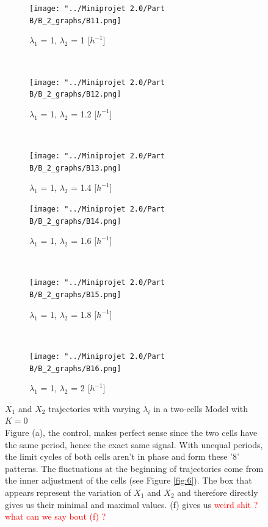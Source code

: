 \documentclass[10pt,a4paper,oneside,twocolumn]{article}
\newcommand{\red}[1]{\textcolor{red}{#1}}
\numberwithin{equation}{section} %
\begin{document}
    \begin{figure}
    \centering
	\begin{subfigure}[b]{0.32\textwidth}
	    \texttt{[image: "../Miniprojet 2.0/Part B/B\_2\_graphs/B11.png]}
	    \caption{$\lambda_1$ = 1, $\lambda_2$ = 1 [$h^{-1}$]}
	\end{subfigure}
	~ 
	\begin{subfigure}[b]{0.32\textwidth}
	    \texttt{[image: "../Miniprojet 2.0/Part B/B\_2\_graphs/B12.png]}
	    \caption{$\lambda_1$ = 1, $\lambda_2$ = 1.2 [$h^{-1}$]}
	\end{subfigure}
	~ 
	\begin{subfigure}[b]{0.32\textwidth}
	    \texttt{[image: "../Miniprojet 2.0/Part B/B\_2\_graphs/B13.png]}
	    \caption{$\lambda_1$ = 1, $\lambda_2$ = 1.4 [$h^{-1}$]}
	\end{subfigure}
	 
	\begin{subfigure}[b]{0.32\textwidth}
	    \texttt{[image: "../Miniprojet 2.0/Part B/B\_2\_graphs/B14.png]}
	    \caption{$\lambda_1$ = 1, $\lambda_2$ = 1.6 [$h^{-1}$]}
	\end{subfigure}
	~ 
	\begin{subfigure}[b]{0.32\textwidth}
	    \texttt{[image: "../Miniprojet 2.0/Part B/B\_2\_graphs/B15.png]}
	    \caption{$\lambda_1$ = 1, $\lambda_2$ = 1.8 [$h^{-1}$]}
	\end{subfigure}
	~ 
	\begin{subfigure}[b]{0.32\textwidth}
	    \texttt{[image: "../Miniprojet 2.0/Part B/B\_2\_graphs/B16.png]}
	    \caption{$\lambda_1$ = 1, $\lambda_2$ = 2 [$h^{-1}$]}
	\end{subfigure}

	\caption{$X_1$ and $X_2$ trajectories with varying $\lambda_i$ in a two-cells Model with $K=0$\\
	Figure (a), the control, makes perfect sense since the two cells have the same period, hence the exact same signal. With unequal periods, the limit cycles of both cells aren't in phase and form these '8' patterns. The fluctuations at the beginning of trajectories come from the inner adjustment of the cells (see Figure \ref{fig:6}). The box that appears represent the variation of $X_1$ and $X_2$ and therefore directly gives us their minimal and maximal values. (f) gives us \red{weird shit ?}\red{what can we say bout (f) ?}}
	\label{fig:11}
    \end{figure}
    
\end{document}
